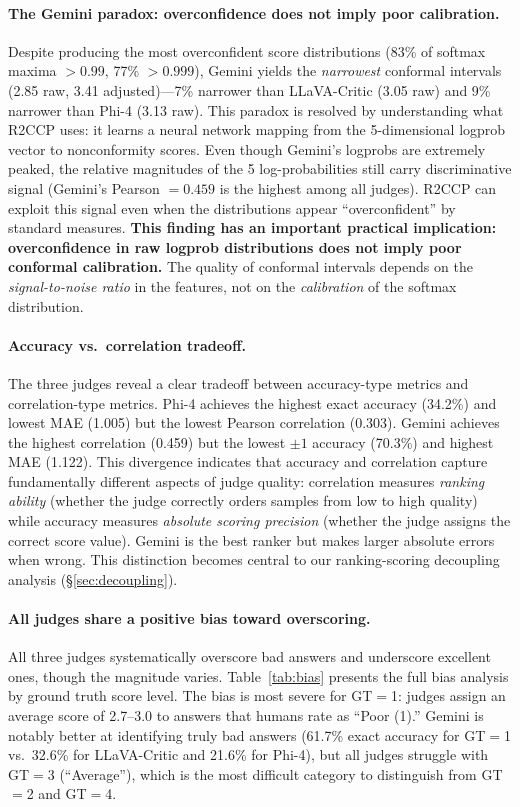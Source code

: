 \documentclass{article}
\begin{document}
\paragraph{The Gemini paradox: overconfidence does not imply poor calibration.} Despite producing the most overconfident score distributions (83\% of softmax maxima $> 0.99$, 77\% $> 0.999$), Gemini yields the \emph{narrowest} conformal intervals (2.85 raw, 3.41 adjusted)---7\% narrower than LLaVA-Critic (3.05 raw) and 9\% narrower than Phi-4 (3.13 raw). This paradox is resolved by understanding what R2CCP uses: it learns a neural network mapping from the 5-dimensional logprob vector to nonconformity scores. Even though Gemini's logprobs are extremely peaked, the relative magnitudes of the 5 log-probabilities still carry discriminative signal (Gemini's Pearson $= 0.459$ is the highest among all judges). R2CCP can exploit this signal even when the distributions appear ``overconfident'' by standard measures. \textbf{This finding has an important practical implication: overconfidence in raw logprob distributions does not imply poor conformal calibration.} The quality of conformal intervals depends on the \emph{signal-to-noise ratio} in the features, not on the \emph{calibration} of the softmax distribution.

\paragraph{Accuracy vs.\ correlation tradeoff.} The three judges reveal a clear tradeoff between accuracy-type metrics and correlation-type metrics. Phi-4 achieves the highest exact accuracy (34.2\%) and lowest MAE (1.005) but the lowest Pearson correlation (0.303). Gemini achieves the highest correlation (0.459) but the lowest $\pm 1$ accuracy (70.3\%) and highest MAE (1.122). This divergence indicates that accuracy and correlation capture fundamentally different aspects of judge quality: correlation measures \emph{ranking ability} (whether the judge correctly orders samples from low to high quality) while accuracy measures \emph{absolute scoring precision} (whether the judge assigns the correct score value). Gemini is the best ranker but makes larger absolute errors when wrong. This distinction becomes central to our ranking-scoring decoupling analysis (\S\ref{sec:decoupling}).

\paragraph{All judges share a positive bias toward overscoring.} All three judges systematically overscore bad answers and underscore excellent ones, though the magnitude varies. Table~\ref{tab:bias} presents the full bias analysis by ground truth score level. The bias is most severe for GT$=$1: judges assign an average score of 2.7--3.0 to answers that humans rate as ``Poor (1).'' Gemini is notably better at identifying truly bad answers (61.7\% exact accuracy for GT$=$1 vs.\ 32.6\% for LLaVA-Critic and 21.6\% for Phi-4), but all judges struggle with GT$=$3 (``Average''), which is the most difficult category to distinguish from GT$=$2 and GT$=$4.
\end{document}
